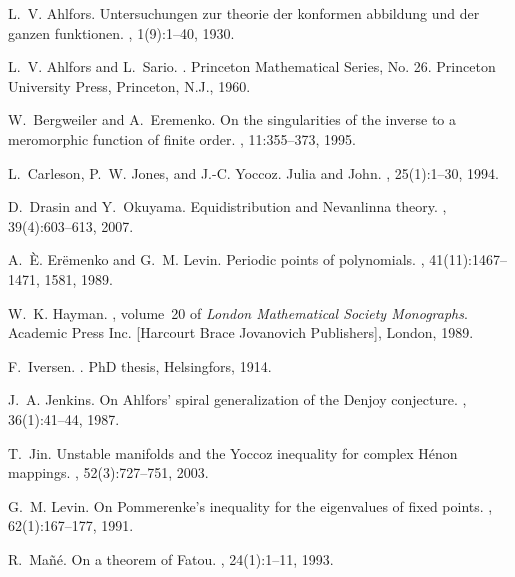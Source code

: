 \documentclass[a4paper,12pt]{amsart}
\theoremstyle{plain}
\theoremstyle{definition}
\theoremstyle{remark}
\numberwithin{equation}{section}
\begin{document}
 
\begin{thebibliography}{10}

L.~V. Ahlfors.
\newblock Untersuchungen zur theorie der konformen abbildung und der ganzen
  funktionen.
, 1(9):1--40, 1930.

L.~V. Ahlfors and L.~Sario.
.
\newblock Princeton Mathematical Series, No. 26. Princeton University Press,
  Princeton, N.J., 1960.

W.~Bergweiler and A.~Eremenko.
\newblock On the singularities of the inverse to a meromorphic function of
  finite order.
, 11:355--373, 1995.

L.~Carleson, P.~W. Jones, and J.-C. Yoccoz.
\newblock Julia and {J}ohn.
, 25(1):1--30, 1994.

D.~Drasin and Y.~Okuyama.
\newblock Equidistribution and {N}evanlinna theory.
, 39(4):603--613, 2007.

A.~{\`E}. Er{\"e}menko and G.~M. Levin.
\newblock Periodic points of polynomials.
, 41(11):1467--1471, 1581, 1989.

W.~K. Hayman.
, volume~20 of {\em London
  Mathematical Society Monographs}.
\newblock Academic Press Inc. [Harcourt Brace Jovanovich Publishers], London,
  1989.

F.~Iversen.
.
\newblock PhD thesis, Helsingfors, 1914.

J.~A. Jenkins.
\newblock On {A}hlfors' spiral generalization of the {D}enjoy conjecture.
, 36(1):41--44, 1987.

T.~Jin.
\newblock Unstable manifolds and the {Y}occoz inequality for complex {H}\'enon
  mappings.
, 52(3):727--751, 2003.

G.~M. Levin.
\newblock On {P}ommerenke's inequality for the eigenvalues of fixed points.
, 62(1):167--177, 1991.

R.~Ma{\~n}{\'e}.
\newblock On a theorem of {F}atou.
, 24(1):1--11, 1993.


\end{thebibliography}
\end{document}
